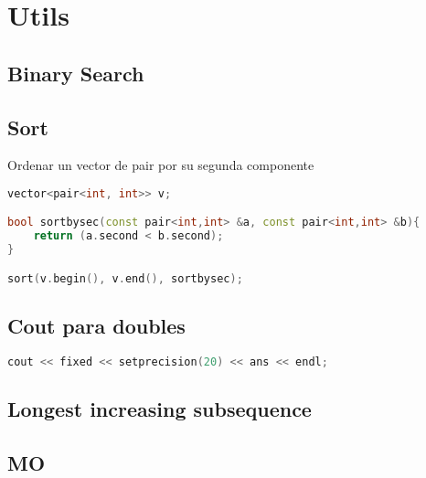\section{Utils}

\subsection{Binary Search}


\subsection{Sort}
Ordenar un vector de pair por su segunda componente
\begin{lstlisting}[language=C++]
vector<pair<int, int>> v;

bool sortbysec(const pair<int,int> &a, const pair<int,int> &b){
	return (a.second < b.second);
}

sort(v.begin(), v.end(), sortbysec);
\end{lstlisting}
\subsection{Cout para doubles}
\begin{lstlisting}[language=C++]
cout << fixed << setprecision(20) << ans << endl;
\end{lstlisting}
\subsection{Longest increasing subsequence}

\subsection{MO}

\newpage


